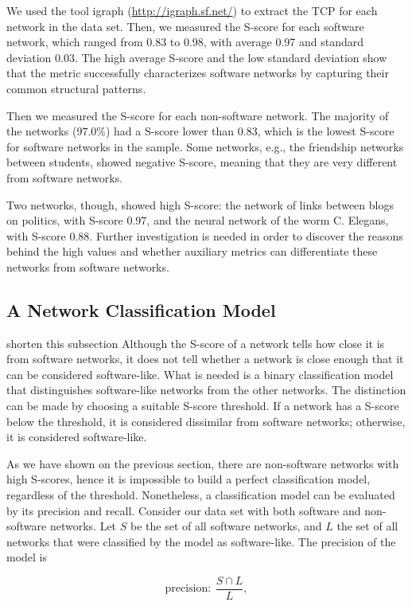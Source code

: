 We used the tool igraph (\url{http://igraph.sf.net/}) to extract the TCP for
each network in the data set. Then, we measured the S-score for each software
network, which ranged from 0.83 to 0.98, with average 0.97 and standard
deviation 0.03. The high average S-score and the low standard deviation show
that the metric successfully characterizes software networks by capturing their
common structural patterns.

Then we measured the S-score for each non-software network. The majority of the
networks (97.0\%) had a S-score lower than 0.83, which is the lowest S-score
for software networks in the sample. Some networks, e.g., the friendship
networks between students, showed negative S-score, meaning that they are very
different from software networks.

Two networks, though, showed high S-score: the network of links between blogs
on politics, with S-score 0.97, and the neural network of the worm C. Elegans,
with S-score 0.88. Further investigation is needed in order to discover the
reasons behind the high values and whether auxiliary metrics can differentiate
these networks from software networks.

\subsection{A Network Classification Model} \label{sec:classmodel} %
shorten this subsection Although the S-score of a network tells how close it is
from software networks, it does not tell whether a network is close enough that
it can be considered software-like. What is needed is a binary classification
model that distinguishes software-like networks from the other networks. The
distinction can be made by choosing a suitable S-score threshold. If a network
has a S-score below the threshold, it is considered dissimilar from software
networks; otherwise, it is considered software-like.

As we have shown on the previous section, there are non-software networks with
high S-scores, hence it is impossible to build a perfect classification model,
regardless of the threshold. Nonetheless, a classification model can be
evaluated by its precision and recall. Consider our data set with both software
and non-software networks. Let $S$ be the set of all software networks, and $L$
the set of all networks that were classified by the model as software-like. The
precision of the model is

$$
\mathrm{precision}: ~\frac{S \cap L}{L},
$$

